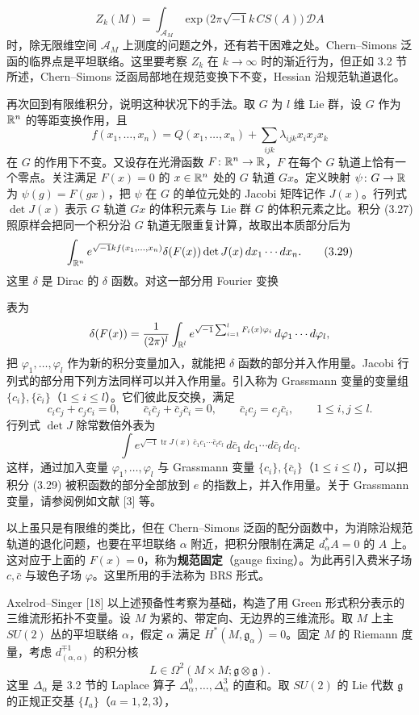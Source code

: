 \[
  Z_k(M)=\int_{\mathcal{A}_M}\exp\bigl(2\pi\sqrt{-1}k\,CS(A)\bigr)\,\mathcal{D}A
\]
时，除无限维空间 $\mathcal{A}_M$ 上测度的问题之外，还有若干困难之处。Chern--Simons 泛函的临界点是平坦联络。这里要考察 $Z_k$ 在 $k\to\infty$ 时的渐近行为，但正如 3.2 节所述，Chern--Simons 泛函局部地在规范变换下不变，Hessian 沿规范轨道退化。

再次回到有限维积分，说明这种状况下的手法。取 $G$ 为 $l$ 维 Lie 群，设 $G$ 作为 $\mathbb{R}^{n}$ 的等距变换作用，且
\[
  f(x_1,\dots,x_n)=Q(x_1,\dots,x_n)+\sum_{ijk}\lambda_{ijk}x_ix_jx_k
\]
在 $G$ 的作用下不变。又设存在光滑函数 $F\colon\mathbb{R}^{n}\to\mathbb{R}$，$F$ 在每个 $G$ 轨道上恰有一个零点。关注满足 $F(x)=0$ 的 $x\in\mathbb{R}^{n}$ 处的 $G$ 轨道 $Gx$。定义映射 $\psi\colon G\to\mathbb{R}$ 为 $\psi(g)=F(gx)$，把 $\psi$ 在 $G$ 的单位元处的 Jacobi 矩阵记作 $J(x)$。行列式 $\det J(x)$ 表示 $G$ 轨道 $Gx$ 的体积元素与 Lie 群 $G$ 的体积元素之比。积分 (3.27) 照原样会把同一个积分沿 $G$ 轨道无限重复计算，故取出本质部分后为
\begin{equation}
  \int_{\mathbb{R}^{n}}e^{\sqrt{-1}kf(x_1,\dots,x_n)}
  \delta(F(x))\det J(x)\,dx_1\cdots dx_n . \tag{3.29}
\end{equation}
这里 $\delta$ 是 Dirac 的 $\delta$ 函数。对这一部分用 Fourier 变换

表为
\[
  \delta(F(x))=\frac{1}{(2\pi)^{l}}\int_{\mathbb{R}^{l}}e^{\sqrt{-1}\sum_{i=1}^{l}F_i(x)\varphi_i}
  \,d\varphi_1\cdots d\varphi_l,
\]
把 $\varphi_1,\dots,\varphi_l$ 作为新的积分变量加入，就能把 $\delta$ 函数的部分并入作用量。Jacobi 行列式的部分用下列方法同样可以并入作用量。引入称为 Grassmann 变量的变量组 $\{c_i\},\{\bar c_i\}$（$1\le i\le l$）。它们彼此反交换，满足
\[
  c_ic_j+c_jc_i=0,\qquad \bar c_i\bar c_j+\bar c_j\bar c_i=0,\qquad
  \bar c_ic_j=c_j\bar c_i,\qquad 1\le i,j\le l .
\]
行列式 $\det J$ 除常数倍外表为
\[
  \int e^{\sqrt{-1}\operatorname{tr}J(x)\,\bar c_1c_1\cdots\bar c_l c_l}
  \,d\bar c_1\,dc_1\cdots d\bar c_l\,dc_l .
\]
这样，通过加入变量 $\varphi_1,\dots,\varphi_l$ 与 Grassmann 变量 $\{c_i\},\{\bar c_i\}$（$1\le i\le l$），可以把积分 (3.29) 被积函数的部分全部放到 $e$ 的指数上，并入作用量。关于 Grassmann 变量，请参阅例如文献 [3] 等。

以上虽只是有限维的类比，但在 Chern--Simons 泛函的配分函数中，为消除沿规范轨道的退化问题，也要在平坦联络 $\alpha$ 附近，把积分限制在满足 $d_\alpha^{*}A=0$ 的 $A$ 上。这对应于上面的 $F(x)=0$，称为\textbf{规范固定}（gauge fixing）。为此再引入费米子场 $c,\bar c$ 与玻色子场 $\varphi$。这里所用的手法称为 BRS 形式。

Axelrod--Singer [18] 以上述预备性考察为基础，构造了用 Green 形式积分表示的三维流形拓扑不变量。设 $M$ 为紧的、带定向、无边界的三维流形。取 $M$ 上主 $SU(2)$ 丛的平坦联络 $\alpha$，假定 $\alpha$ 满足 $H^{*}(M,\mathfrak{g}_\alpha)=0$。固定 $M$ 的 Riemann 度量，考虑 $d_{(\alpha,\alpha)}^{\mp1}$ 的积分核
\[
  L\in\Omega^{2}(M\times M;\mathfrak{g}\otimes\mathfrak{g}).
\]
这里 $\Delta_\alpha$ 是 3.2 节的 Laplace 算子 $\Delta_\alpha^{0},\dots,\Delta_\alpha^{3}$ 的直和。取 $SU(2)$ 的 Lie 代数 $\mathfrak{g}$ 的正规正交基 $\{I_a\}$（$a=1,2,3$），

